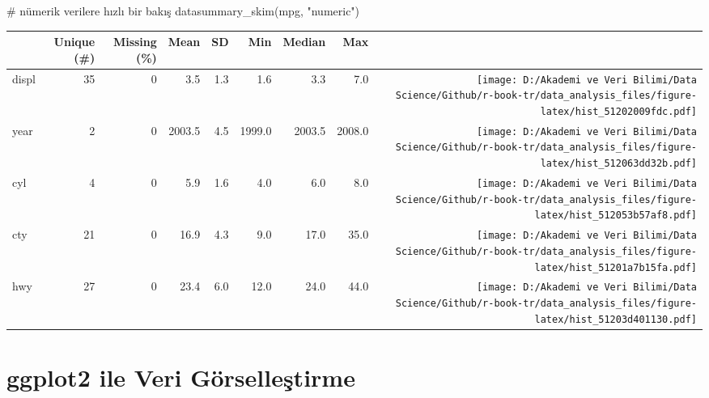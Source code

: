\documentclass[
  letterpaper,
  DIV=11,
  numbers=noendperiod]{scrreprt}
\newenvironment{Shaded}{\begin{snugshade}}{\end{snugshade}}
\newcommand{\CommentTok}[1]{\textcolor[rgb]{0.37,0.37,0.37}{#1}}
\newcommand{\FunctionTok}[1]{\textcolor[rgb]{0.28,0.35,0.67}{#1}}
\newcommand{\NormalTok}[1]{\textcolor[rgb]{0.00,0.23,0.31}{#1}}
\newcommand{\StringTok}[1]{\textcolor[rgb]{0.13,0.47,0.30}{#1}}
\begin{document}
\begin{Shaded}
\begin{Highlighting}[]
\CommentTok{\# nümerik verilere hızlı bir bakış}
\FunctionTok{datasummary\_skim}\NormalTok{(mpg, }\StringTok{"numeric"}\NormalTok{)}
\end{Highlighting}
\end{Shaded}

\begin{table}
\centering
\begin{tabular}[t]{lrrrrrrr>{}r}
\toprule
  & Unique (\#) & Missing (\%) & Mean & SD & Min & Median & Max &   \\
\midrule
displ & 35 & 0 & \num{3.5} & \num{1.3} & \num{1.6} & \num{3.3} & \num{7.0} & \texttt{[image: D:/Akademi ve Veri Bilimi/Data Science/Github/r-book-tr/data\_analysis\_files/figure-latex/hist\_51202009fdc.pdf]}\\
year & 2 & 0 & \num{2003.5} & \num{4.5} & \num{1999.0} & \num{2003.5} & \num{2008.0} & \texttt{[image: D:/Akademi ve Veri Bilimi/Data Science/Github/r-book-tr/data\_analysis\_files/figure-latex/hist\_512063dd32b.pdf]}\\
cyl & 4 & 0 & \num{5.9} & \num{1.6} & \num{4.0} & \num{6.0} & \num{8.0} & \texttt{[image: D:/Akademi ve Veri Bilimi/Data Science/Github/r-book-tr/data\_analysis\_files/figure-latex/hist\_512053b57af8.pdf]}\\
cty & 21 & 0 & \num{16.9} & \num{4.3} & \num{9.0} & \num{17.0} & \num{35.0} & \texttt{[image: D:/Akademi ve Veri Bilimi/Data Science/Github/r-book-tr/data\_analysis\_files/figure-latex/hist\_51201a7b15fa.pdf]}\\
hwy & 27 & 0 & \num{23.4} & \num{6.0} & \num{12.0} & \num{24.0} & \num{44.0} & \texttt{[image: D:/Akademi ve Veri Bilimi/Data Science/Github/r-book-tr/data\_analysis\_files/figure-latex/hist\_51203d401130.pdf]}\\
\bottomrule
\end{tabular}
\end{table}


\hypertarget{ggplot2-ile-veri-guxf6rselleux15ftirme}{%
\chapter*{ggplot2 ile Veri
Görselleştirme}\label{ggplot2-ile-veri-guxf6rselleux15ftirme}}

\end{document}
